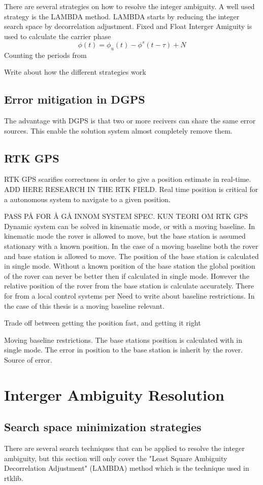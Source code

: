 There are several strategies on how to resolve the integer ambiguity. A well used strategy is the LAMBDA method. LAMBDA starts by reducing the integer search space by decorrelation adjustment.
Fixed and Float
Interger Amiguity is used to calculate the carrier phase
\begin{equation}
\phi(t) = \phi_u(t)-\phi^s(t-\tau)+N
\end{equation}
Counting the periods from

Write about how the different strategies work
\subsection{Error mitigation in DGPS}
The advantage with DGPS is that two or more recivers can share the same error sources. This enable the solution system almost completely remove them.



\subsection{RTK GPS}
RTK GPS scarifies correctness in order to give a position estimate in real-time. ADD HERE RESEARCH IN THE RTK FIELD. Real time position is critical for a autonomous system to navigate to a given position. 


PASS PÅ FOR Å GÅ INNOM SYSTEM SPEC. KUN TEORI OM RTK GPS
Dynamic system can be solved in kinematic mode, or with a moving baseline. In kinematic mode the rover is allowed to move, but the base station is assumed stationary with a known position. In the case of a moving baseline both the rover and base station is allowed to move. The position of the base station is calculated in single mode. Without a known position of the base station the global position of the rover can never be better then if calculated in single mode. However the relative position of the rover from the base station is calculate accurately. There for from a local control systems per
Need to write about baseline restrictions. In the case of this thesis is a moving baseline relevant.

Trade off between getting the position fast, and getting it right 

Moving baseline restrictions. The base stations position is calculated with in single mode. The error in position to the base station is inherit by the rover. Source of error.
\section{Interger Ambiguity Resolution}

\subsection{Search space minimization strategies}
There are several search techniques that can be applied to resolve the integer ambiguity, but this section will only cover the "Least Square Ambiguity Decorrelation Adjustment" (LAMBDA) method which is the technique used in rtklib.


\cleardoublepage